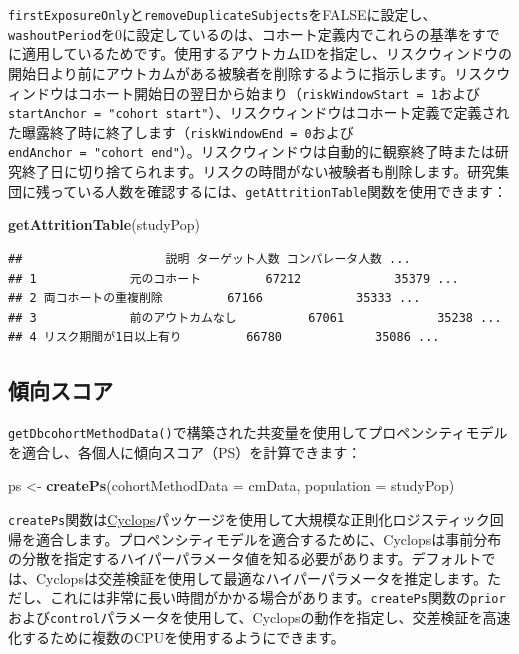 \documentclass[
  11pt]{book}
\newenvironment{Shaded}{\begin{snugshade}}{\end{snugshade}}
\newcommand{\AttributeTok}[1]{\textcolor[rgb]{0.13,0.29,0.53}{#1}}
\newcommand{\FunctionTok}[1]{\textcolor[rgb]{0.13,0.29,0.53}{\textbf{#1}}}
\newcommand{\NormalTok}[1]{#1}
\newcommand{\OtherTok}[1]{\textcolor[rgb]{0.56,0.35,0.01}{#1}}
\theoremstyle{definition}
\theoremstyle{definition}
\theoremstyle{definition}
\theoremstyle{definition}
\theoremstyle{remark}
\begin{document}
\texttt{firstExposureOnly}と\texttt{removeDuplicateSubjects}をFALSEに設定し、\texttt{washoutPeriod}を0に設定しているのは、コホート定義内でこれらの基準をすでに適用しているためです。使用するアウトカムIDを指定し、リスクウィンドウの開始日より前にアウトカムがある被験者を削除するように指示します。リスクウィンドウはコホート開始日の翌日から始まり（\texttt{riskWindowStart\ =\ 1}および\texttt{startAnchor\ =\ "cohort\ start"}）、リスクウィンドウはコホート定義で定義された曝露終了時に終了します（\texttt{riskWindowEnd\ =\ 0}および\texttt{endAnchor\ =\ "cohort\ end"}）。リスクウィンドウは自動的に観察終了時または研究終了日に切り捨てられます。リスクの時間がない被験者も削除します。研究集団に残っている人数を確認するには、\texttt{getAttritionTable}関数を使用できます：

\begin{Shaded}
\begin{Highlighting}[]
\FunctionTok{getAttritionTable}\NormalTok{(studyPop)}
\end{Highlighting}
\end{Shaded}

\begin{verbatim}
##                    説明 ターゲット人数 コンパレータ人数 ...
## 1             元のコホート         67212             35379 ...
## 2 両コホートの重複削除         67166             35333 ...
## 3             前のアウトカムなし          67061             35238 ...
## 4 リスク期間が1日以上有り         66780             35086 ...
\end{verbatim}

\subsection{傾向スコア}\label{ux50beux5411ux30b9ux30b3ux30a2-1}

\texttt{getDbcohortMethodData()}で構築された共変量を使用してプロペンシティモデルを適合し、各個人に傾向スコア（PS）を計算できます：

\begin{Shaded}
\begin{Highlighting}[]
\NormalTok{ps }\OtherTok{\textless{}{-}} \FunctionTok{createPs}\NormalTok{(}\AttributeTok{cohortMethodData =}\NormalTok{ cmData, }\AttributeTok{population =}\NormalTok{ studyPop)}
\end{Highlighting}
\end{Shaded}

\texttt{createPs}関数は\href{https://ohdsi.github.io/Cyclops/}{Cyclops}パッケージを使用して大規模な正則化ロジスティック回帰を適合します。プロペンシティモデルを適合するために、Cyclopsは事前分布の分散を指定するハイパーパラメータ値を知る必要があります。デフォルトでは、Cyclopsは交差検証を使用して最適なハイパーパラメータを推定します。ただし、これには非常に長い時間がかかる場合があります。\texttt{createPs}関数の\texttt{prior}および\texttt{control}パラメータを使用して、Cyclopsの動作を指定し、交差検証を高速化するために複数のCPUを使用するようにできます。
\end{document}

